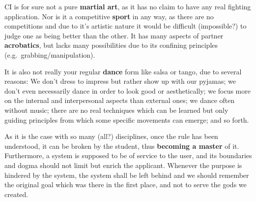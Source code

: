 CI is for sure not a pure \textbf{martial art}, as it has no claim to have any real fighting application.
Nor is it a competitive \textbf{sport} in any way, as there are no competitions and due to it's artistic nature it would be difficult (impossible?) to judge one as being better than the other.
It has many aspects of partner \textbf{acrobatics}, but lacks many possibilities due to its confining principles (e.g.\ grabbing/manipulation).

It is also not really your regular \textbf{dance} form like salsa or tango, due to several reasons: We don't dress to impress but rather show up with our pyjamas; we don't even necessarily dance in order to look good or aesthetically; we focus more on the internal and interpersonal aspects than external ones; we dance often without music; there are no real techniques which can be learned but only guiding principles from which some specific movements can emerge; and so forth.

As it is the case with so many (all?) disciplines, once the rule has been understood, it can be broken by the student, thus \textbf{becoming a master} of it.
Furthermore, a system is supposed to be of service to the user, and its boundaries and dogma should not limit but enrich the applicant.
Whenever the purpose is hindered by the system, the system shall be left behind and we should remember the original goal which was there in the first place, and not to serve the gods we created.
